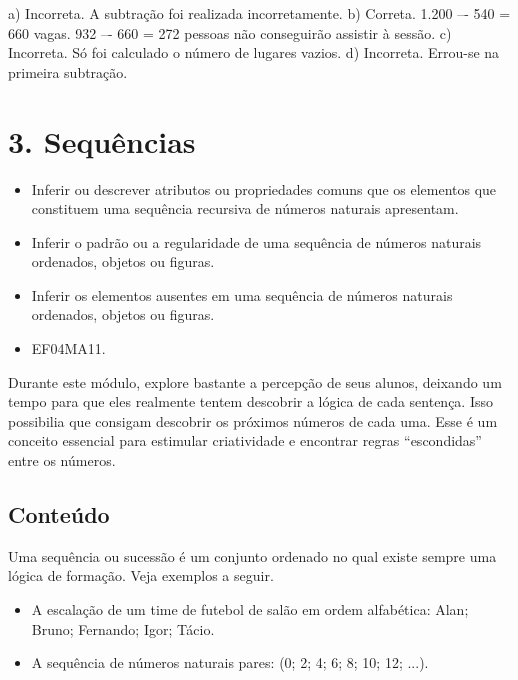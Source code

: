 \begin{enumerate}
\begin{escolha}
a) Incorreta. A subtração foi realizada incorretamente.
b) Correta. 1.200 –- 540 = 660 vagas. 932 –- 660 = 272 pessoas não conseguirão assistir à sessão.
c) Incorreta. Só foi calculado o número de lugares vazios.
d) Incorreta. Errou-se na primeira subtração.


\section{3. Sequências}\label{muxf3dulo-3}


\begin{itemize}
\item Inferir ou descrever atributos ou propriedades comuns que os elementos
que constituem uma sequência recursiva de números naturais apresentam.
\item Inferir o padrão ou a regularidade de uma sequência de números
naturais ordenados, objetos ou figuras.
\item Inferir os elementos ausentes em uma sequência de números naturais
ordenados, objetos ou figuras.
\end{itemize}


\begin{itemize}
\item EF04MA11.
\end{itemize}

\protect\hypertarget{_Hlk128407765}{}{}Durante este módulo,
explore bastante a percepção de seus alunos, deixando um tempo para que eles realmente tentem descobrir a lógica de cada sentença.
Isso possibilia que consigam descobrir os próximos números de cada
uma. Esse é um conceito essencial para estimular criatividade e
encontrar regras ``escondidas'' entre os números.

\subsection{Conteúdo}\label{conteuxfado-2}

Uma sequência ou sucessão é um conjunto ordenado no qual
existe sempre uma lógica de formação. Veja exemplos a seguir.

\begin{itemize}
\item
  A escalação de um time de futebol de salão em ordem alfabética: Alan; Bruno; Fernando; Igor; Tácio.
\item
  A sequência de números naturais pares: (0; 2; 4; 6; 8; 10; 12; ...).
\end{itemize}


\end{escolha}
\end{enumerate}
